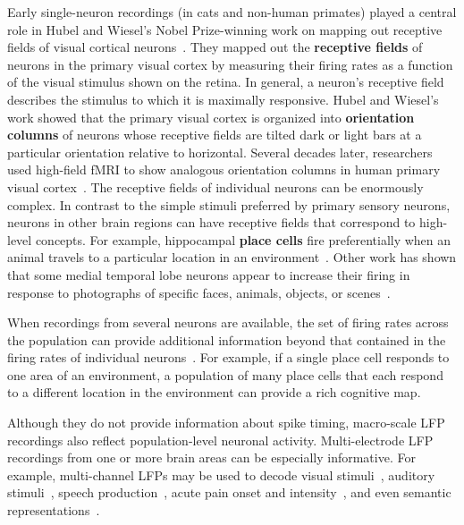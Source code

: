 \documentclass{llmxive}
\begin{document}
Early single-neuron recordings (in cats and non-human primates) played
a central role in Hubel and Wiesel's Nobel Prize-winning work on
mapping out receptive fields of visual cortical
neurons~\citep{HubeWies62, HubeWies68}.  They mapped out the
\textbf{receptive fields} of neurons in the primary visual cortex by
measuring their firing rates as a function of the visual stimulus
shown on the retina.  In general, a neuron's receptive field describes
the stimulus to which it is maximally responsive.  Hubel and Wiesel's
work showed that the primary visual cortex is organized into
\textbf{orientation columns} of neurons whose receptive fields are
tilted dark or light bars at a particular orientation relative to
horizontal.  Several decades later, researchers used high-field fMRI
to show analogous orientation columns in human primary visual
cortex~\citep{YacoEtal08}.  The receptive fields of individual neurons
can be enormously complex.  In contrast to the simple stimuli
preferred by primary sensory neurons, neurons in other brain regions
can have receptive fields that correspond to high-level concepts.  For
example, hippocampal \textbf{place cells} fire preferentially when an
animal travels to a particular location in an
environment~\citep{Tolm48, EkstEtal03, KnieEtal95}.  Other work has
shown that some medial temporal lobe neurons appear to increase their
firing in response to photographs of specific faces, animals, objects,
or scenes~\citep{QuirEtal05}.

When recordings from several neurons are available, the set of firing
rates across the population can provide additional information beyond
that contained in the firing rates of individual
neurons~\citep{PougEtal00, AverEtal06}.  For example, if a single
place cell responds to one area of an environment, a population of
many place cells that each respond to a different location in the
environment can provide a rich cognitive map.

Although they do not provide information about spike timing,
macro-scale LFP recordings also reflect population-level neuronal
activity.  Multi-electrode LFP recordings from one or more brain areas
can be especially informative.  For example, multi-channel LFPs may be
used to decode visual stimuli~\citep{BeliEtal08, BeliEtal10}, auditory
stimuli~\citep{BeliEtal10, SmitEtal13d}, speech
production~\citep{PaslEtal12, HamiEtal21, ProiEtal22}, acute pain onset and
intensity~\citep{ZhanEtal18}, and even semantic
representations~\citep{DezfDali20, MannEtal12}.
\end{document}

